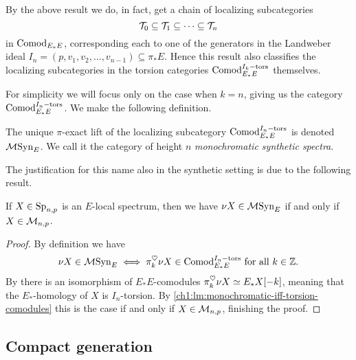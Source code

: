 \begin{remark}
    \label{ch3:add:rm:chain-of-localizing-subcategories}
    By the above result we do, in fact, get a chain of localizing subcategories
    \[\mathcal{T}_0 \subseteq \mathcal{T}_1\subseteq \cdots \subseteq \mathcal{T}_n \]
    in $\mathrm{Comod}_{E_*E}$, corresponding each to one of the generators in the Landweber ideal $I_n=(p, v_1, v_2, \ldots, v_{n-1})\subseteq \pi_* E$. Hence this result also classifies the localizing subcategories in the torsion categories $\mathrm{Comod}_{E_*E}^{I_k-\mathrm{tors}}$ themselves.  
\end{remark}

For simplicity we will focus only on the case when $k=n$, giving us the category $\mathrm{Comod}_{E_*E}^{I_n-\mathrm{tors}}$. We make the following definition. 

\begin{definition}
    The unique $\pi$-exact lift of the localizing subcategory $\mathrm{Comod}_{E_*E}^{I_n-\mathrm{tors}}$ is denoted $\mathcal{M}\mathrm{Syn}_{E}$. We call it the category of height $n$ \emph{monochromatic synthetic spectra}. 
\end{definition}

The justification for this name also in the synthetic setting is due to the following result. 

\begin{lemma}
    \label{ch3:add:lm:mono-iff-syn-mono}
    If $X\in \mathrm{Sp}_{n,p}$ is an $E$-local spectrum, then we have $\nu X \in \mathcal{M}\mathrm{Syn}_{E}$ if and only if $X\in \mathcal{M}_{n,p}$. 
\end{lemma}
\begin{proof}
    By definition we have 
    \[\nu X \in \mathcal{M}\mathrm{Syn}_{E} \iff \pi_k^\heartsuit \nu X \in \mathrm{Comod}_{E_*E}^{I_n-\mathrm{tors}} \text{ for all } k\in \mathbb{Z}.\]
    By \cite[4.21, 4.22]{pstragowski_2022} there is an isomorphism of $E_*E$-comodules $\pi_k^\heartsuit \nu X \simeq E_{*} X[-k]$, meaning that the $E_{*}$-homology of $X$ is $I_n$-torsion. By \cref{ch1:lm:monochromatic-iff-torsion-comodules} this is the case if and only if $X\in \mathcal{M}_{n,p}$, finishing the proof. 
\end{proof}










\subsection{Compact generation}

